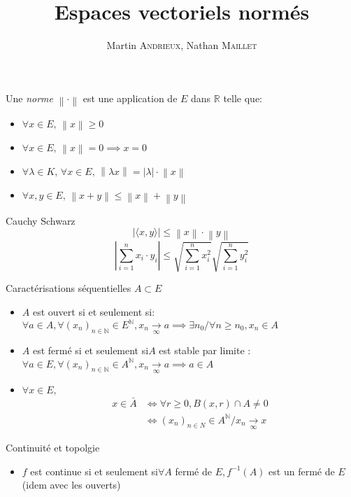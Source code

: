 \documentclass[french, a4paper, 11pt, twocolumn]{article}
\title{Espaces vectoriels normés}
\author{Martin \textsc{Andrieux}, Nathan \textsc{Maillet}}
\date{}
\newcommand{\ssi}{si et seulement si\xspace}		%
\newcommand{\norme}[1]{\left\| #1\right\|}
\newcommand{\abs}[1]{\left\lvert #1\right\rvert}
\newcommand{\limit}[1]{\underset{#1}{\rightarrow}}  %
\newcommand{\N}{\mathbb{N}}   %
\newcommand{\R}{\mathbb{R}}   %
\begin{document}
\maketitle

\begin{definition}
  Une \emph{norme} $\norme{\cdot}$ est une application de $E$ dans $\R$ telle que:
  \begin{itemize}[label=$\bullet$]
    \item $\forall x\in E,\,\norme{x}\geqslant 0$
    \item $\forall x\in E,\,\norme{x}=0\implies x=0$
    \item $\forall\lambda\in K,\,\forall x\in E,\, \norme{\lambda x}=\abs{\lambda} \cdot \norme{x}$
    \item $\forall x,y\in E,\, \norme{x+y}\leqslant\norme{x}+\norme{y}$
  \end{itemize}
\end{definition}

\begin{theoreme}{Cauchy Schwarz}
  \[\left\lvert \langle x,y\rangle\right\rvert\leqslant\norme{x}\cdot\norme{y}\]
  \tcblower
  \[\abs{\sum_{i=1}^n x_{i}\cdot y_{i}}\leqslant \sqrt{\sum_{i=1}^n x_{i}^{2}}\sqrt{\sum_{i=1}^n y_{i}^{2}}\]
\end{theoreme}

\begin{theoreme}{Caractérisations séquentielles}
    $A \subset E$
    \begin{itemize}[label=$\bullet$]
        \item $A$ est ouvert \ssi : \\
    $\forall a \in A, \forall (x_n)_{n\in \N} \in E^{\N}, x_n\limit{\infty}a \implies \exists n_0 / \forall n \geq n_0, x_n \in A$
        \item $A$ est fermé \ssi $A$ est stable par limite : $\forall a \in E, \forall (x_n)_{n\in \N} \in A^{\N}, x_n\limit{\infty}a \implies a \in A$
        \item $\forall x \in E,$
        \begin{align*} 
            x \in \bar{A} &\iff \forall r \geq 0, B(x,r) \cap A \neq 0 \\
                        &\iff (x_n)_{n\in N} \in A^{\N} / x_n \limit{\infty} x
        \end{align*}
    \end{itemize}
\end{theoreme}

\begin{theoreme}{Continuité et topolgie}
    \begin{itemize}[label=$\bullet$]
        \item $f$ est continue \ssi $\forall A$ fermé de $E$,$\, f^{-1}(A)$ est un fermé de $E$ (idem avec les ouverts)
    \end{itemize}
\end{theoreme}
\end{document}
